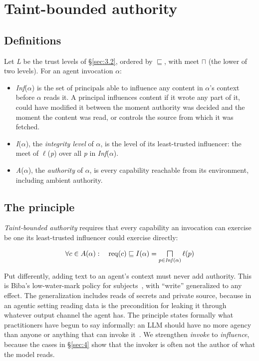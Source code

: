 \documentclass[acmsmall,screen,review]{acmart}
\providecommand{\bigsqcap}{\mathop{\vcenter{\hbox{\Large$\sqcap$}}}}
\begin{document}
\section{Taint-bounded authority}\label{sec:5}


\subsection{Definitions}\label{sec:5.1}

Let \emph{L} be the trust levels of \S\ref{sec:3.2}, ordered by $\sqsubseteq$, with meet $\sqcap$ (the lower of two levels). For an agent invocation $\alpha$:

\begin{itemize}
\item \emph{Inf}($\alpha$) is the set of principals able to influence any content in $\alpha$'s context before $\alpha$ reads it. A principal influences content if it wrote any part of it, could have modified it between the moment authority was decided and the moment the content was read, or controls the source from which it was fetched.
\item \emph{I}($\alpha$), the \emph{integrity level} of $\alpha$, is the level of its least-trusted influencer: the meet of $\ell$(\emph{p}) over all \emph{p} in \emph{Inf}($\alpha$).
\item \emph{A}($\alpha$), the \emph{authority} of $\alpha$, is every capability reachable from its environment, including ambient authority.
\end{itemize}


\subsection{The principle}\label{sec:5.2}

\emph{Taint-bounded authority} requires that every capability an invocation can exercise be one its least-trusted influencer could exercise directly:

\begin{equation}\label{eq:tba}
\forall c \in A(\alpha):\quad \mathrm{req}(c) \sqsubseteq I(\alpha) = \bigsqcap_{p \in \mathit{Inf}(\alpha)} \ell(p)
\end{equation}

Put differently, adding text to an agent's context must never add authority. This is Biba's low-water-mark policy for subjects~\cite{biba1977integrity}, with ``write'' generalized to any effect. The generalization includes reads of secrets and private source, because in an agentic setting reading data is the precondition for leaking it through whatever output channel the agent has. The principle states formally what practitioners have begun to say informally: an LLM should have no more agency than anyone or anything that can invoke it~\cite{stawinski2026trusting}. We strengthen \emph{invoke} to \emph{influence}, because the cases in \S\ref{sec:4} show that the invoker is often not the author of what the model reads.
\end{document}
